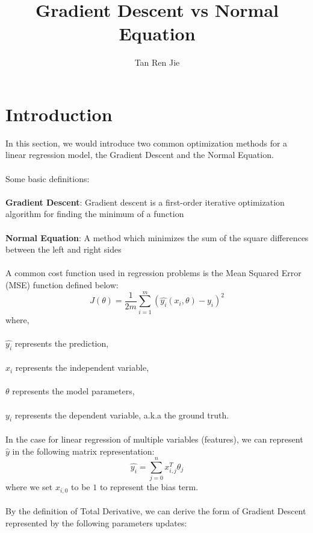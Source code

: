 \documentclass{article}
\begin{document}
\author{Tan Ren Jie}
\title{Gradient Descent vs Normal Equation}
\maketitle
\tableofcontents
\pagebreak
\section{Introduction}
In this section, we would introduce two common optimization methods for a linear regression model, the Gradient Descent and the Normal Equation. \\ \\
Some basic definitions:\\ \\
\textbf{Gradient Descent}: Gradient descent is a first-order iterative optimization algorithm for finding the minimum of a function \\ \\
\textbf{Normal Equation}: A method which minimizes the sum of the square differences between the left and right sides \\ \\
A common cost function used in regression problems is the Mean Squared Error (MSE) function defined below:
\begin{equation}
	J(\theta) = \frac{1}{2m} \sum_{i = 1}^{m} (\hat{y_i}(x_i, \theta) - y_i)^2
\end{equation}
where,\\ \\
$\hat{y_i}$ represents the prediction, \\ \\
$x_i$ represents the independent variable, \\ \\
$\theta$ represents the model parameters, \\ \\
$y_i$ represents the dependent variable, a.k.a the ground truth. \\ \\
In the case for linear regression of multiple variables (features), we can represent $\hat{y}$ in the following matrix representation:
\begin{equation}
	\hat{y_i} = \sum_{j = 0}^{n} x_{i,j}^{T} \theta_j
\end{equation}
where we set $x_{i,0}$ to be $1$ to represent the bias term. \\ \\
By the definition of Total Derivative, we can derive the form of Gradient Descent represented by the following parameters updates:\
\end{document}
